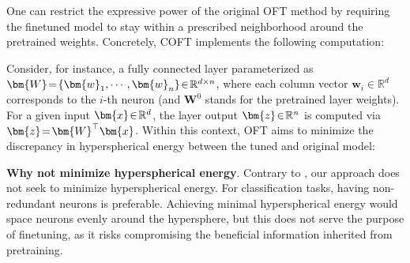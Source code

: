 One can restrict the expressive power of the original OFT method by requiring the finetuned model to stay within a prescribed neighborhood around the pretrained weights. Concretely, COFT implements the following computation:

Consider, for instance, a fully connected layer parameterized as $\thickmuskip=2mu \medmuskip=2mu \bm{W}=\{\bm{w}_1,\cdots,\bm{w}_n\}\in\mathbb{R}^{d\times n}$, where each column vector $\bm{w}_i\in\mathbb{R}^{d}$ corresponds to the $i$-th neuron (and $\bm{W}^0$ stands for the pretrained layer weights). For a given input $\thickmuskip=2mu \medmuskip=2mu \bm{x}\in\mathbb{R}^d$, the layer output $\thickmuskip=2mu \medmuskip=2mu \bm{z}\in\mathbb{R}^n$ is computed via $\thickmuskip=2mu \medmuskip=2mu \bm{z}=\bm{W}^\top\bm{x}$. Within this context, OFT aims to minimize the discrepancy in hyperspherical energy between the tuned and original model:

\textbf{Why not minimize hyperspherical energy}. Contrary to \cite{liu2021orthogonal}, our approach does not seek to minimize hyperspherical energy. For classification tasks, having non-redundant neurons is preferable. Achieving minimal hyperspherical energy would space neurons evenly around the hypersphere, but this does not serve the purpose of finetuning, as it risks compromising the beneficial information inherited from pretraining.

